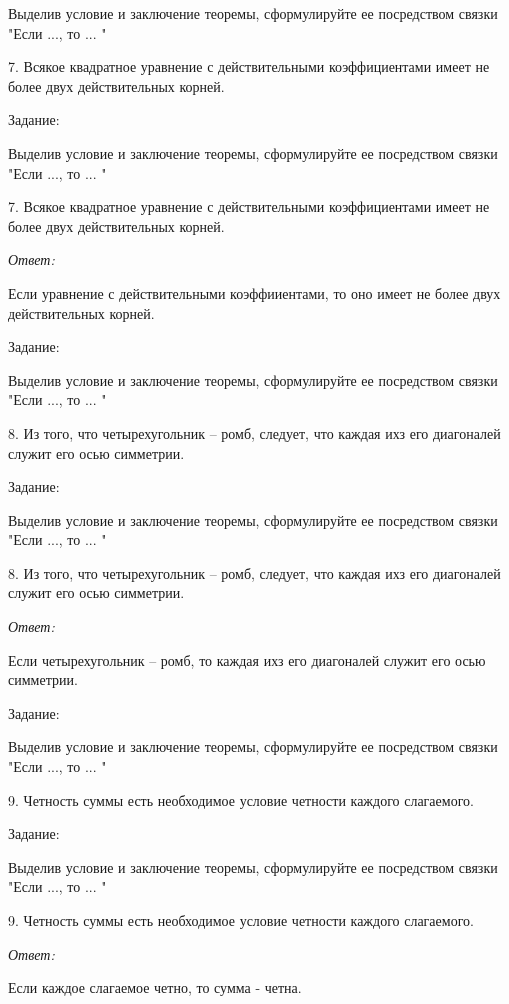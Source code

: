 \documentclass[10pt]{beamer}
\theoremstyle{remark}
\theoremstyle{definition}
\begin{document}
\begin{frame}[allowframebreaks]
Выделив условие и заключение теоремы, сформулируйте ее посредством связки "Если ..., то ... "

7. Всякое квадратное уравнение с действительными коэффициентами имеет не более двух действительных корней.


\framebreak 

Задание: 

Выделив условие и заключение теоремы, сформулируйте ее посредством связки "Если ..., то ... "

7. Всякое квадратное уравнение с действительными коэффициентами имеет не более двух действительных корней.

\textit{Ответ:} 

Если уравнение с действительными коэффииентами, то оно имеет не более двух действительных корней.


\framebreak 

Задание: 

Выделив условие и заключение теоремы, сформулируйте ее посредством связки "Если ..., то ... "

8. Из того, что четырехугольник -- ромб, следует, что каждая ихз его диагоналей служит его осью симметрии.


\framebreak 

Задание: 

Выделив условие и заключение теоремы, сформулируйте ее посредством связки "Если ..., то ... "

8. Из того, что четырехугольник -- ромб, следует, что каждая ихз его диагоналей служит его осью симметрии.

\textit{Ответ:} 

Если четырехугольник -- ромб, то  каждая ихз его диагоналей служит его осью симметрии.

\framebreak 

Задание: 

Выделив условие и заключение теоремы, сформулируйте ее посредством связки "Если ..., то ... "

9. Четность суммы есть необходимое условие четности каждого слагаемого.


\framebreak 

Задание: 

Выделив условие и заключение теоремы, сформулируйте ее посредством связки "Если ..., то ... "

9. Четность суммы есть необходимое условие четности каждого слагаемого.

\textit{Ответ:} 

Если каждое слагаемое четно, то сумма - четна.


\end{frame}
\end{document}
